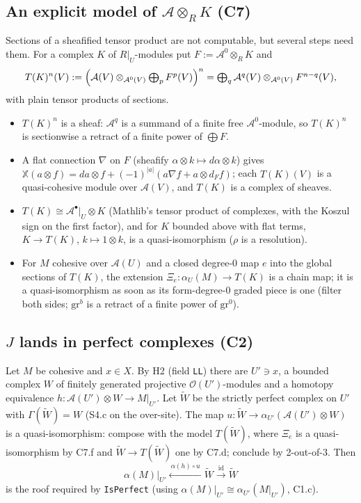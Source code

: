 \documentclass[11pt,a4paper]{article}
\newcommand{\code}[1]{\texttt{#1}}
\newcommand{\cA}{\mathcal{A}}
\newcommand{\Ocal}{\mathcal{O}}
\newcommand{\X}{\mathbb{X}}
\begin{document}
\subsection{\texorpdfstring{An explicit model of $\cA\otimes_R K$ (C7)}{An explicit model of A ⊗ K (C7)}}
Sections of a sheafified tensor product are not computable, but several steps need them. For a
complex $K$ of $R|_U$-modules put $F:=\cA^0\otimes_R K$ and
\[ T(K)^n(V) := \Bigl(\cA(V)\otimes_{\cA^0(V)}\textstyle\bigoplus_p F^p(V)\Bigr)^n
= \textstyle\bigoplus_q \cA^q(V)\otimes_{\cA^0(V)} F^{n-q}(V), \]
with plain tensor products of sections.
\begin{itemize}
\item[C7.a] $T(K)^n$ is a sheaf: $\cA^q$ is a summand of a finite free $\cA^0$-module, so $T(K)^n$ is
sectionwise a retract of a finite power of $\bigoplus F$.
\item[C7.b,c] A flat connection $\nabla$ on $F$ (sheafify $\alpha\otimes k\mapsto d\alpha\otimes k$) gives
$\X(a\otimes f)=da\otimes f+(-1)^{|a|}(a\nabla f+a\otimes d_Ff)$; each $T(K)(V)$ is a quasi-cohesive
module over $\cA(V)$, and $T(K)$ is a complex of sheaves.
\item[C7.d] $T(K)\cong\cA^\bullet|_U\otimes K$ (Mathlib's tensor product of complexes, with the Koszul
sign on the first factor), and for $K$ bounded above with flat terms, $K\to T(K)$,
$k\mapsto1\otimes k$, is a quasi-isomorphism ($\rho$ is a resolution).
\item[C7.e,f] For $M$ cohesive over $\cA(U)$ and a closed degree-0 map $e$ into the global
sections of $T(K)$, the extension $\Xi_e\colon\alpha_U(M)\to T(K)$ is a chain map; it is a
quasi-isomorphism as soon as its form-degree-0 graded piece is one (filter both sides; $\mathrm{gr}^b$ is
a retract of a finite power of $\mathrm{gr}^0$).
\end{itemize}

\subsection{\texorpdfstring{$J$ lands in perfect complexes (C2)}{J lands in perfect complexes (C2)}}
Let $M$ be cohesive and $x\in X$. By H2 (field \code{LL}) there are $U'\ni x$, a bounded complex
$W$ of finitely generated projective $\Ocal(U')$-modules and a homotopy equivalence
$h\colon\cA(U')\otimes W\to M|_{U'}$. Let $\tilde W$ be the strictly perfect complex on $U'$ with
$\Gamma(\tilde W)=W$ (S4.c on the over-site). The map
$u\colon\tilde W\to\alpha_{U'}(\cA(U')\otimes W)$ is a quasi-isomorphism: compose with the
model $T(\tilde W)$, where $\Xi_e$ is a quasi-isomorphism by C7.f and $\tilde W\to T(\tilde W)$ one by
C7.d; conclude by 2-out-of-3. Then
\[ \alpha(M)|_{U'} \xleftarrow{\ \alpha(h)\circ u\ } \tilde W \xrightarrow{\ \mathrm{id}\ } \tilde W \]
is the roof required by \code{IsPerfect} (using $\alpha(M)|_{U'}\cong\alpha_{U'}(M|_{U'})$, C1.c).
\end{document}
